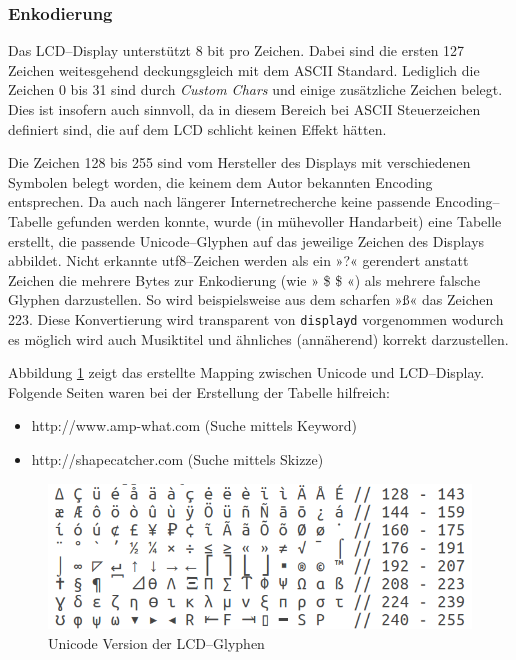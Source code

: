 \documentclass[11pt,ngerman,toc=listof,index=totoc]{scrreprt}
\providecommand{\tightlist}{%
  \setlength{\itemsep}{0pt}\setlength{\parskip}{0pt}}
\begin{document}
\subsubsection{Enkodierung}\label{enkodierung}

Das LCD--Display unterstützt 8 bit pro Zeichen. Dabei sind die ersten
127 Zeichen weitesgehend deckungsgleich mit dem ASCII Standard.
Lediglich die Zeichen 0 bis 31 sind durch \emph{Custom Chars} und einige
zusätzliche Zeichen belegt. Dies ist insofern auch sinnvoll, da in
diesem Bereich bei ASCII Steuerzeichen definiert sind, die auf dem LCD
schlicht keinen Effekt hätten.

Die Zeichen 128 bis 255 sind vom Hersteller des Displays mit
verschiedenen Symbolen belegt worden, die keinem dem Autor bekannten
Encoding entsprechen. Da auch nach längerer Internetrecherche keine
passende Encoding--Tabelle gefunden werden konnte, wurde (in mühevoller
Handarbeit) eine Tabelle erstellt, die passende Unicode--Glyphen auf das
jeweilige Zeichen des Displays abbildet. Nicht erkannte utf8--Zeichen
werden als ein »?« gerendert anstatt Zeichen die mehrere Bytes zur
Enkodierung (wie » \$ \mu \$ «) als mehrere falsche Glyphen
darzustellen. So wird beispielsweise aus dem scharfen »ß« das Zeichen
223. Diese Konvertierung wird transparent von \texttt{displayd}
vorgenommen wodurch es möglich wird auch Musiktitel und ähnliches
(annäherend) korrekt darzustellen.

Abbildung \ref{eulenfunk-encoding} zeigt das erstellte Mapping zwischen
Unicode und LCD--Display. Folgende Seiten waren bei der Erstellung der
Tabelle hilfreich:

\begin{itemize}
\tightlist
\item
  http://www.amp-what.com (Suche mittels Keyword)
\item
  http://shapecatcher.com (Suche mittels Skizze)
\end{itemize}

\begin{figure}[h!]
  \centering
  \includegraphics[width=1.0\textwidth]{images/encoding.png}
  \caption{Unicode Version der LCD--Glyphen}
  \label{eulenfunk-encoding}
\end{figure}
\end{document}
